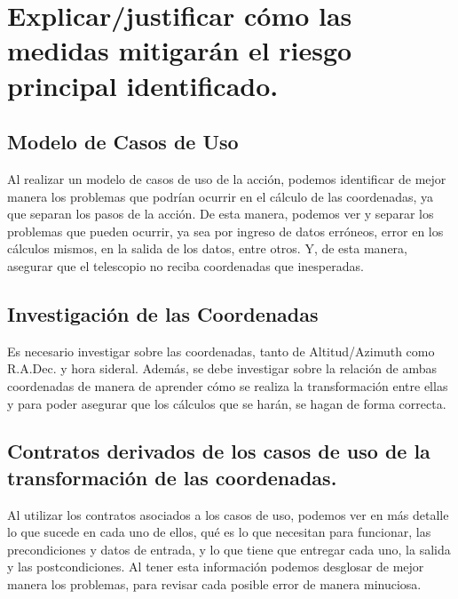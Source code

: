 \documentclass[letterpaper,spanish,10pt]{article}
\begin{document}
\section{Explicar/justificar c\'omo las medidas mitigar\'an el riesgo principal identificado.}

\subsection{Modelo de Casos de Uso}

Al realizar un modelo de casos de uso de la acci\'on, podemos identificar de mejor manera los problemas que podr\'ian ocurrir en el c\'alculo de las coordenadas, ya que separan los pasos de la acci\'on. De esta manera, podemos ver y separar los problemas que pueden ocurrir, ya sea por ingreso de datos err\'oneos, error en los c\'alculos mismos, en la salida de los datos, entre otros. Y, de esta manera, asegurar que el telescopio no reciba coordenadas que inesperadas.

\subsection{Investigaci\'on de las Coordenadas}

Es necesario investigar sobre las coordenadas, tanto de Altitud/Azimuth como R.A.Dec. y hora sideral. Adem\'as, se debe investigar sobre la relaci\'on de ambas coordenadas de manera de aprender c\'omo se realiza la transformaci\'on entre ellas y para poder asegurar que los c\'alculos que se har\'an, se hagan de forma correcta.

\subsection{Contratos derivados de los casos de uso de la transformaci\'on de las coordenadas.}

Al utilizar los contratos asociados a los casos de uso, podemos ver en m\'as detalle lo que sucede en cada uno de ellos, qu\'e es lo que necesitan para funcionar, las precondiciones y datos de entrada, y lo que tiene que entregar cada uno, la salida y las postcondiciones. Al tener esta informaci\'on podemos desglosar de mejor manera los problemas, para revisar cada posible error de manera minuciosa.
\end{document}
